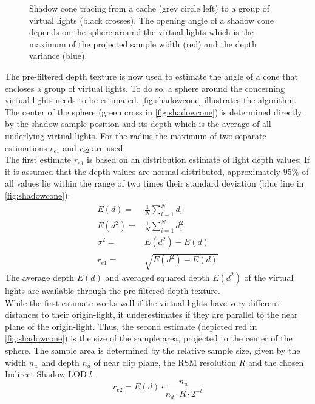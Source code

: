\documentclass[thesis.tex]{subfiles}
\begin{document}
\begin{figure}[h]
	\centering
	\caption{Shadow cone tracing from a cache (grey circle left) to a group of virtual lights (black crosses). The opening angle of a shadow cone depends on the sphere around the virtual lights which is the maximum of the projected sample width (red) and the depth variance (blue).} \label{fig:shadowcone}
\end{figure}
The pre-filtered depth texture is now used to estimate the angle of a cone that encloses a group of virtual lights.
To do so, a sphere around the concerning virtual lights needs to be estimated.
\autoref{fig:shadowcone} illustrates the algorithm.
The center of the sphere (green cross in \autoref{fig:shadowcone}) is determined directly by the shadow sample position and its depth which is the average of all underlying virtual lights.
For the radius the maximum of two separate estimations $r_{e1}$ and $r_{e2}$ are used.
\\
The first estimate $r_{e1}$ is based on an distribution estimate of light depth values:
If it is assumed that the depth values are normal distributed, approximately $95\%$ of all values lie within the range of two times their standard deviation (blue line in \autoref{fig:shadowcone}).
\begin{align}
E(d) =& \frac{1}{N} \sum\limits_{i=1}^{N} d_i\\
E(d^2) =& \frac{1}{N} \sum\limits_{i=1}^{N} d_i^2\\
\sigma^2 =& E(d^2) - E(d)\\
r_{e1} =& \sqrt{E(d^2) - E(d)}
\end{align}
The average depth $E(d)$ and averaged squared depth $E(d^2)$ of the virtual lights are available through the pre-filtered depth texture.
\\
While the first estimate works well if the virtual lights have very different distances to their origin-light, it underestimates if they are parallel to the near plane of the origin-light.
Thus, the second estimate (depicted red in \autoref{fig:shadowcone}) is the size of the sample area, projected to the center of the sphere.
The sample area is determined by the relative sample size, given by the width $n_w$ and depth $n_d$ of near clip plane, the RSM resolution $R$ and the chosen Indirect Shadow LOD $l$.
\begin{equation}
r_{e2} = E(d) \cdot \frac{n_w}{n_d \cdot R \cdot 2^{-l} }
\end{equation}
\end{document}
